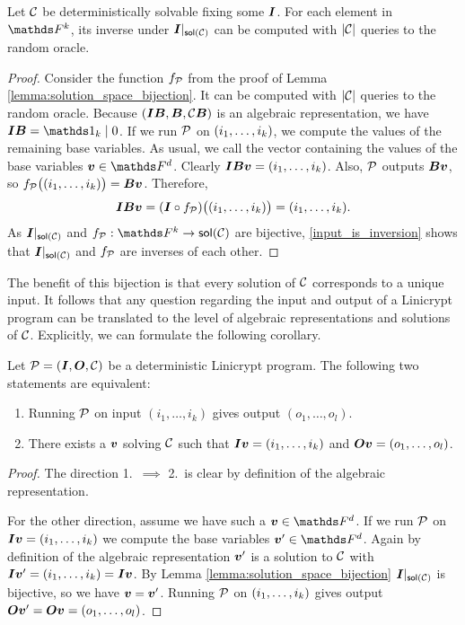 \begin{corollary}
\label{det_solvable_computeable}
    Let $\C$ be deterministically solvable fixing some $\I$.
    For each element in $\F^k$, its inverse under $\I|_{\sol(\C)}$ can be computed with $|\C|$ queries to the random oracle.
\end{corollary}

\begin{proof}
    Consider the function $f_\P$ from the proof of Lemma \ref{lemma:solution_space_bijection}.
    It can be computed with $|\C|$ queries to the random oracle.
    Because $(\I\B, \B, \C\B)$ is an algebraic representation,
    we have $\I\B = \Id_k \mid 0$. 
    If we run $\P$ on $(\dts i k)$, we compute the values of the remaining base variables.
    As usual, we call the vector containing the values of the base variables $\vv \in \Fsp$.
    Clearly $\I\B \vv = (\dts i k)$.
    Also, $\P$ outputs $\B\vv$, so $f_\P\big((\dts i k)\big) = \B\vv$. 
    Therefore, 
    \begin{equation}
    \label{input_is_inversion}
    \I\B \vv = (\I \circ f_\P)\big((\dts i k)\big) = (\dts i k).
    \end{equation}
    As $\I|_{\sol(\C)}$ and $f_\P: \F^k \to \sol(\C)$ are bijective,
    \eqref{input_is_inversion} shows that $\I|_{\sol(\C)}$ and $f_\P$ are inverses of each other.
\end{proof}

The benefit of this bijection is that every solution of $\C$ corresponds to a unique input.
It follows that any question regarding the input and output of a Linicrypt program can be translated to the level of algebraic representations and solutions of $\C$.
Explicitly, we can formulate the following corollary.

\begin{corollary}
\label{det_solvable_equiv}
    Let $\P = (\I, \O, \C)$ be a deterministic Linicrypt program.
    The following two statements are equivalent:
    \begin{enumerate}
    \item
        Running $\P$ on input $(i_1, \dots, i_k)$ gives output $(o_1, \dots, o_l)$.
    \item 
        There exists a $\vv$ solving $\C$ such that
        $\I\vv = (\dts i k)$ and
        $\O\vv = (\dts o l)$.
    \end{enumerate}
\end{corollary}

\begin{proof}
    The direction 1.~$\implies$ 2.~is clear by definition of the algebraic representation.
    
    For the other direction, assume we have such a $\vv \in \Base$.
    If we run $\P$ on $\I\vv = (\dts i k)$ we compute the base variables $\vv' \in \Base$.
    Again by definition of the algebraic representation $\vv'$ is a solution to $\C$ with $\I\vv' = (\dts i k) = \I\vv$.
    By Lemma \ref{lemma:solution_space_bijection} $\I|_{\sol(\C)}$ is bijective,
    so we have $\vv = \vv'$.
    Running $\P$ on $(\dts i k)$ gives output $\O\vv' = \O\vv = (\dts o l)$.
\end{proof}

